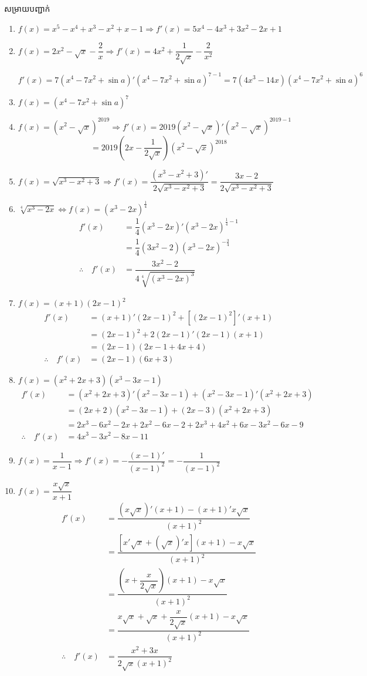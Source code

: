 \documentclass[12pt,fleqn]{book} %
\newcommand{\solution}{{\begin{center}\kml \color{blue} សម្រាយបញ្ជាក់\end{center} }}
\begin{document}
\solution 
\begin{enumerate}
\item $f(x)=x^5-x^4+x^3-x^2+x-1 \Longrightarrow f'(x)=5x^4-4x^3+3x^2-2x+1$
\item $f(x)=2x^2-\sqrt{x}-\dfrac{2}{x}\Longrightarrow f'(x)=4x^2+\dfrac{1}{2\sqrt{x}}-\dfrac{2}{x^2}$
\begin{center}
$f'(x)=7(x^4-7x^2+\sin a)'(x^4-7x^2+\sin a)^{7-1}=7(4x^3-14x)(x^4-7x^2+\sin a)^6$
\end{center}

\item $f(x)=(x^4-7x^2+\sin a)^7$
\item $f(x)=(x^2-\sqrt{x})^{2019}\Longrightarrow f'(x)=2019(x^2-\sqrt{x})'(x^2-\sqrt{x})^{2019-1}$
$$=2019\left(2x-\dfrac{1}{2\sqrt{x}}\right)(x^2-\sqrt{x})^{2018}$$
\item $f(x)=\sqrt{x^3-x^2+3}\Longrightarrow f'(x)=\dfrac{(x^3-x^2+3)'}{2\sqrt{x^3-x^2+3}}=\dfrac{3x-2}{2\sqrt{x^3-x^2+3}}$
\item $\sqrt[4]{x^3-2x} \Longleftrightarrow f(x)=(x^3-2x)^{\frac{1}{4}}$
\begin{align*}
f'(x)&=\dfrac{1}{4}(x^3-2x)'(x^3-2x)^{\frac{1}{4}-1}\\
&=\dfrac{1}{4}(3x^2-2)(x^3-2x)^{-\frac{3}{4}}\\
\therefore \quad f'(x)&=\dfrac{3x^2-2}{4\sqrt[4]{(x^3-2x)^3}}
\end{align*}
\item $f(x)=(x+1)(2x-1)^2$
\begin{align*}
f'(x)&=(x+1)'(2x-1)^2+[(2x-1)^2]'(x+1)\\
&=(2x-1)^2+2(2x-1)'(2x-1)(x+1)\\
&=(2x-1)(2x-1+4x+4)\\
\therefore \quad f'(x)&=(2x-1)(6x+3)
\end{align*}
\item $f(x)=(x^2+2x+3)(x^3-3x-1)$
\begin{align*}
 f'(x)&=(x^2+2x+3)'(x^2-3x-1)+(x^2-3x-1)'(x^2+2x+3)\\
 &=(2x+2)(x^2-3x-1)+(2x-3)(x^2+2x+3)\\
 &=2x^3-6x^2-2x+2x^2-6x-2+2x^3+4x^2+6x-3x^2-6x-9\\
 \therefore \quad f'(x)&=4x^3-3x^2-8x-11
 \end{align*}
 \item $f(x)=\dfrac{1}{x-1}\Longrightarrow f'(x)=-\dfrac{(x-1)'}{(x-1)^2}=-\dfrac{1}{(x-1)^2}$
 \item $f(x)=\dfrac{x\sqrt{x}}{x+1}$
 \begin{align*}
 f'(x)&=\dfrac{(x\sqrt{x})'(x+1)-(x+1)'x\sqrt{x}}{(x+1)^2}\\
 &=\dfrac{[x'\sqrt{x}+(\sqrt{x})'x ](x+1)-x\sqrt{x}}{(x+1)^2}\\
 &=\dfrac{\left(x+\dfrac{x}{2\sqrt{x}}\right)(x+1)-x\sqrt{x}}{(x+1)^2}\\
 &=\dfrac{x\sqrt{x}+\sqrt{x}+\dfrac{x}{2\sqrt{x}}(x+1)-x\sqrt{x}}{(x+1)^2}\\
 \therefore \quad f'(x)&= \dfrac{x^2+3x}{2\sqrt{x}(x+1)^2} 
 \end{align*}
 

\end{enumerate}
\end{document}
